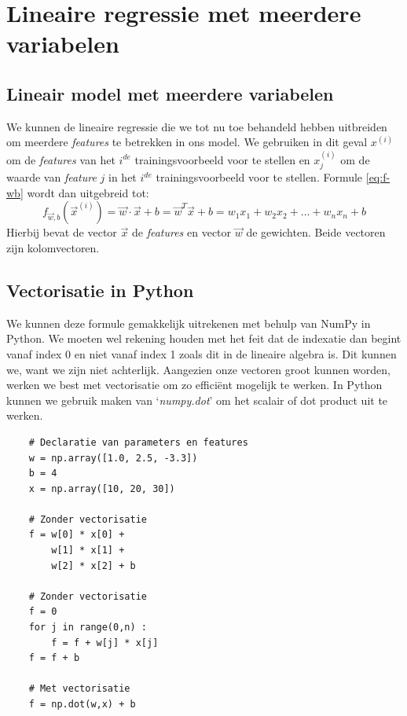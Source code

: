 \section{Lineaire regressie met meerdere variabelen}

\subsection{Lineair model met meerdere variabelen}
We kunnen de lineaire regressie die we tot nu toe behandeld hebben uitbreiden om meerdere \textit{features} te betrekken in ons model. We gebruiken in dit geval $x^{(i)}$ om de \textit{features} van het $i^{de}$ trainingsvoorbeeld voor te stellen en $x^{(i)}_{j}$ om de waarde van \textit{feature} $j$ in het $i^{de}$ trainingsvoorbeeld voor te stellen. Formule \ref{eq:f-wb} wordt dan uitgebreid tot:
\begin{equation}
	f_{\vec{w},b}(\vec{x}^{(i)}) = \vec{w} \cdot \vec{x} + b = \vec{w}^{T} \vec{x} + b = w_{1}x_{1} + w_{2}x_{2} + \ldots + w_{n}x_{n} + b
	\label{eq:f-wb-multi}
\end{equation}
\noindent
Hierbij bevat de vector $\vec{x}$ de \textit{features} en vector $\vec{w}$ de gewichten. Beide vectoren zijn kolomvectoren. 

\subsection{Vectorisatie in Python}

We kunnen deze formule gemakkelijk uitrekenen met behulp van NumPy in Python. We moeten wel rekening houden met het feit dat de indexatie dan begint vanaf index 0 en niet vanaf index 1 zoals dit in de lineaire algebra is. Dit kunnen we, want we zijn niet achterlijk. Aangezien onze vectoren groot kunnen worden, werken we best met vectorisatie om zo efficiënt mogelijk te werken. In Python kunnen we gebruik maken van `\textit{numpy.dot}' om het scalair of dot product uit te werken. \\

\begin{lstlisting}
	# Declaratie van parameters en features
	w = np.array([1.0, 2.5, -3.3])
	b = 4
	x = np.array([10, 20, 30])
	
	# Zonder vectorisatie
	f = w[0] * x[0] + 
	    w[1] * x[1] + 
	    w[2] * x[2] + b
	
	# Zonder vectorisatie
	f = 0
	for j in range(0,n) : 
	    f = f + w[j] * x[j]
	f = f + b
	
	# Met vectorisatie
	f = np.dot(w,x) + b
\end{lstlisting}

